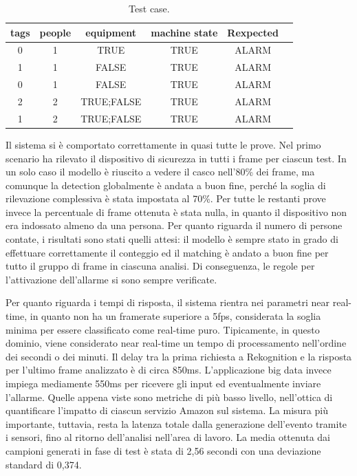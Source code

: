 \begin{table}[htbp]
\centering
\begin{tabular}{|c|c|c|c|c|c|}
\toprule
\textbf{tags} & \textbf{people} & \textbf{equipment} & \textbf{machine state} & \textbf{Rexpected} \\ \midrule

 0 & 1 & TRUE & TRUE & ALARM  \\ \midrule
 1 & 1 & FALSE & TRUE & ALARM     \\ \midrule
 0 & 1 & FALSE & TRUE & ALARM    \\ \midrule
 2 & 2 & TRUE;FALSE & TRUE & ALARM    \\ \midrule
 1 & 2 & TRUE;FALSE & TRUE & ALARM    \\ \midrule
\end{tabular}
\caption{Test case.}
\label{tab:test-cases}
\end{table}

Il sistema si è comportato correttamente in quasi tutte le prove. Nel primo scenario ha rilevato il dispositivo di sicurezza in tutti i frame per ciascun test. In un solo caso il modello è riuscito a vedere il casco nell'80\% dei frame, ma comunque la detection globalmente è andata a buon fine, perché la soglia di rilevazione complessiva è stata impostata al 70\%. Per tutte le restanti prove invece la percentuale di frame ottenuta è stata nulla, in quanto il dispositivo non era indossato almeno da una persona. Per quanto riguarda il numero di persone contate, i risultati sono stati quelli attesi: il modello è sempre stato in grado di effettuare correttamente il conteggio ed il matching è andato a buon fine per tutto il gruppo di frame in ciascuna analisi. Di conseguenza, le regole per l'attivazione dell'allarme si sono sempre verificate.

Per quanto riguarda i tempi di risposta, il sistema rientra nei parametri near real-time, in quanto non ha un framerate superiore a 5fps, considerata la soglia minima per essere classificato come real-time puro. Tipicamente, in questo dominio, viene considerato near real-time un tempo di processamento nell'ordine dei secondi o dei minuti. Il delay tra la prima richiesta a Rekognition e la risposta per l'ultimo frame analizzato è di circa 850ms. L'applicazione big data invece impiega mediamente 550ms per ricevere gli input ed eventualmente inviare l'allarme. Quelle appena viste sono metriche di più basso livello, nell'ottica di quantificare l'impatto di ciascun servizio Amazon sul sistema. La misura più importante, tuttavia, resta la latenza totale dalla generazione dell'evento tramite i sensori, fino al ritorno dell'analisi nell'area di lavoro. La media ottenuta dai campioni generati in fase di test è stata di 2,56 secondi con una deviazione standard di 0,374.

